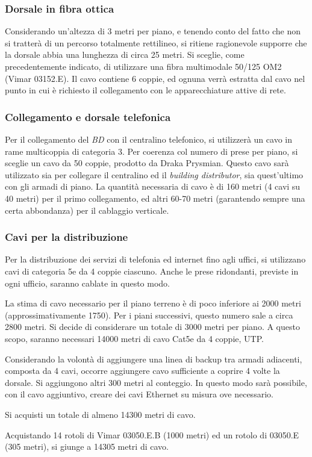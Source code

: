 \subsubsection{Dorsale in fibra ottica}
Considerando un'altezza di 3 metri per piano, e tenendo conto del fatto che non si tratterà di un percorso totalmente
rettilineo, si ritiene ragionevole supporre che la dorsale abbia una lunghezza di circa 25 metri. Si sceglie, come
precedentemente indicato, di utilizzare una fibra multimodale 50/125 OM2 (Vimar 03152.E). Il cavo contiene 6 coppie, ed ognuna verrà estratta
dal cavo nel punto in cui è richiesto il collegamento con le apparecchiature attive di rete.

\subsubsection{Collegamento e dorsale telefonica}
Per il collegamento del \textit{BD} con il centralino telefonico, si utilizzerà un cavo in rame multicoppia di categoria 3.
Per coerenza col numero di prese per piano, si sceglie un cavo da 50 coppie, prodotto da Draka Prysmian.
Questo cavo sarà utilizzato sia per collegare il centralino ed il \textit{building distributor}, sia quest'ultimo con gli armadi
di piano. La quantità necessaria di cavo è di 160 metri (4 cavi su 40 metri) per il primo collegamento, ed altri
60-70 metri (garantendo sempre una certa abbondanza) per il cablaggio verticale.

\subsubsection{Cavi per la distribuzione}
Per la distribuzione dei servizi di telefonia ed internet fino agli uffici, si utilizzano cavi di categoria 5e da 4 coppie ciascuno.
Anche le prese ridondanti, previste in ogni ufficio, saranno cablate in questo modo.

La stima di cavo necessario per il piano terreno è di poco inferiore ai 2000 metri (approssimativamente 1750).
Per i piani successivi, questo numero sale a circa 2800 metri. Si decide di considerare un totale di 3000 metri per piano.
A questo scopo, saranno necessari 14000 metri di cavo Cat5e da 4 coppie, UTP.

Considerando la volontà di aggiungere una linea di backup tra armadi adiacenti, composta da 4 cavi, occorre aggiungere cavo sufficiente
a coprire 4 volte la dorsale. Si aggiungono altri 300 metri al conteggio. In questo modo sarà possibile, con il cavo aggiuntivo,
creare dei cavi Ethernet su misura ove necessario.

Si acquisti un totale di almeno 14300 metri di cavo.

Acquistando 14 rotoli di Vimar 03050.E.B (1000 metri) ed un rotolo di 03050.E (305 metri), si giunge a 14305 metri di cavo.